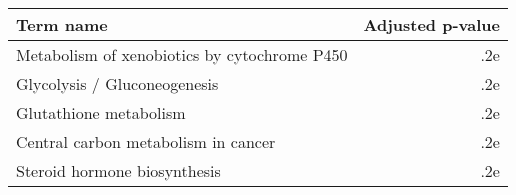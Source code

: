 \begin{tabular}{lr}
\toprule
                                   Term name &  Adjusted p-value \\
\midrule
Metabolism of xenobiotics by cytochrome P450 &               .2e \\
                Glycolysis / Gluconeogenesis &               .2e \\
                      Glutathione metabolism &               .2e \\
         Central carbon metabolism in cancer &               .2e \\
                Steroid hormone biosynthesis &               .2e \\
\bottomrule
\end{tabular}
